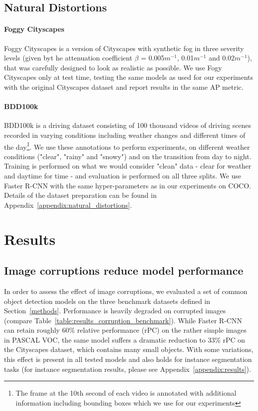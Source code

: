 \documentclass{article}
\begin{document}
\subsection{Natural Distortions}

\paragraph{Foggy Cityscapes}
Foggy Cityscapes \cite{Sakaridis18foggycityscapes} is a version of Cityscapes with synthetic fog in three severity levels (given byt he attenuation coefficient $\beta$ = 0.005$m^{-1}$, 0.01$m^{-1}$ and 0.02$m^{-1}$), that was carefully designed to look as realistic as possible. 
We use Fogy Cityscapes only at test time, testing the same models as used for our experiments with the original Cityscapes dataset and report results in the same AP metric.

\paragraph{BDD100k}
BDD100k \cite{yu2018bdd100k} is a driving dataset consisting of 100 thousand videos of driving scenes recorded in varying conditions including weather changes and different times of the day\footnote{The frame at the 10th second of each video is annotated with additional information including bounding boxes which we use for our experiments}. We use these annotations to perform experiments, on different weather conditions ("clear", "rainy" and "snowy") and on the transition from day to night. Training is performed on what we would consider "clean" data - clear for weather and daytime for time - and evaluation is performed on all three splits. We use Faster R-CNN with the same hyper-parameters as in our experiments on COCO. Details of the dataset preparation can be found in Appendix~\ref{appendix:natural_distortions}. \section{Results}
  \label{results}
  
\subsection{Image corruptions reduce model performance}
In order to assess the effect of image corruptions, we evaluated a set of common object detection models on the three benchmark datasets defined in Section~\ref{methods}. Performance is heavily degraded on corrupted images (compare Table~\ref{table:results_corruption_benchmark}). While Faster R-CNN can retain roughly 60\% relative performance (rPC) on the rather simple images in PASCAL VOC, the same model suffers a dramatic reduction to 33\% rPC on the Cityscapes dataset, which contains many small objects. With some variations, this effect is present in all tested models and also holds for instance segmentation tasks (for instance segmentation results, please see Appendix~\ref{appendix:results}).
\end{document}
